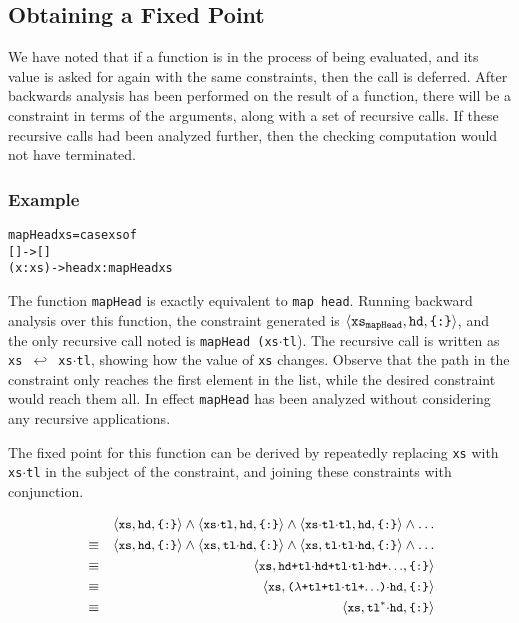 \documentclass[book]{tfp05symp}
\newcommand{\T}[1]{\texttt{#1}}
\newcommand{\tup}[1]{\ensuremath{\langle #1 \rangle}}
\renewcommand{\c}[3]{\tup{\T{#1},\T{#2},\T{\{#3\}}}}
\newcommand{\s}[1]{\ensuremath{_{\tt #1}}}
\newcommand{\K}{\ensuremath{^\ast}}
\newcommand{\D}{\ensuremath{\cdot}}
\newcommand{\mapsfrom}{\hookleftarrow}
\newcounter{exmp}
\newcommand{\yesexample}{\subsubsection*{Example \arabic{exmp}}\addtocounter{exmp}{1}}
\newenvironment{code}{\begin{alltt}\small}{\end{alltt}}
\begin{document}
\subsection{Obtaining a Fixed Point}
\label{sec:fixed_point}

We have noted that if a function is in the process of being
evaluated, and its value is asked for again with the same
constraints, then the call is deferred. After backwards analysis has
been performed on the result of a function, there will be a
constraint in terms of the arguments, along with a set of recursive
calls. If these recursive calls had been analyzed further, then the
checking computation would not have terminated.

\yesexample

\begin{code}
mapHead xs = case xs of
                  []     -> []
                  (x:xs) -> head x : mapHead xs
\end{code}

The function \T{mapHead} is exactly equivalent to \T{map head}.
Running backward analysis over this function, the constraint
generated is \c{xs\s{mapHead}}{hd}{:}, and the only recursive call
noted is \T{mapHead (xs\D{}tl}). The recursive call is written as
\T{xs $\mapsfrom$ xs\D{}tl}, showing how the value of \T{xs}
changes. Observe that the path in the constraint only reaches the
first element in the list, while the desired constraint would reach
them all. In effect \T{mapHead} has been analyzed without
considering any recursive applications.

The fixed point for this function can be derived by repeatedly
replacing \T{xs} with \T{xs\D{}tl} in the subject of the constraint,
and joining these constraints with conjunction.

\setcounter{equation}{0}
\renewcommand\theequation{\arabic{equation}}
\begin{eqnarray}
&& \small{\c{xs}{hd}{:} \wedge \c{xs\D{}tl}{hd}{:} \wedge
   \c{xs\D{}tl\D{}tl}{hd}{:} \wedge \ldots} \\
& \equiv & \small{\c{xs}{hd}{:} \wedge \c{xs}{tl\D{}hd}{:} \wedge
   \c{xs}{tl\D{}tl\D{}hd}{:} \wedge \ldots} \\
& \equiv & \small{\c{xs}{hd+tl\D{}hd+tl\D{}tl\D{}hd+$\ldots$}{:}} \\
& \equiv & \small{\c{xs}{($\lambda$+tl+tl\D{}tl+$\ldots$)\D{}hd}{:}} \\
& \equiv & \small{\c{xs}{tl\K\D{}hd}{:}}
\end{eqnarray}
\end{document}
